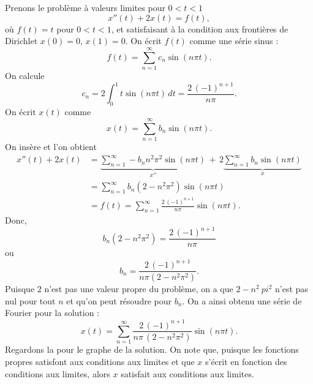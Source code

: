 \begin{example}
Prenons le problème à valeurs limites pour $0 < t < 1$
\begin{equation*}
x''(t) + 2 x(t) = f(t) ,
\end{equation*}
où $f(t) = t$ pour $0 < t < 1$, et satisfaisant à la condition aux frontières de Dirichlet  $x(0) = 0$, $x(1)=0$.
On écrit $f(t)$ comme une série sinus :
\begin{equation*}
f(t) = \sum_{n=1}^\infty c_n \sin (n \pi t) .
\end{equation*}
On calcule
\begin{equation*}
c_n = 2 \int_0^1 t \sin (n \pi t) \,dt = \frac{2 \, {(-1)}^{n+1}}{n \pi} .
\end{equation*}
On écrit  $x(t)$ comme
\begin{equation*}
x(t) = \sum_{n=1}^\infty b_n \sin (n \pi t) .
\end{equation*}
On insère et l'on obtient
\begin{equation*}
\begin{split}
x''(t) + 2 x(t) & =
\underbrace{
\sum_{n=1}^\infty - b_n n^2 \pi^2 \sin (n \pi t)
}_{x''}
\,
+
\,
2
\underbrace{
\sum_{n=1}^\infty b_n \sin (n \pi t)
}_{x}
\\
& =
\sum_{n=1}^\infty b_n (2 - n^2 \pi^2 ) \sin (n \pi t)
\\
& = f(t)
=
\sum_{n=1}^\infty  \frac{2\, {(-1)}^{n+1}}{n \pi} \sin (n \pi t) .
\end{split}
\end{equation*}
Donc,
\begin{equation*}
b_n (2 - n^2 \pi^2)
=
\frac{2\,{(-1)}^{n+1}}{n \pi}
\end{equation*}
ou
\begin{equation*}
b_n
=
\frac{2\,{(-1)}^{n+1}}{n \pi (2 - n^2 \pi^2)} .
\end{equation*}
Puisque $ 2 $ n'est pas une valeur propre du problème, on a que $ 2-n ^ 2 \ pi ^ 2 $ n'est pas nul pour tout $ n $ et qu'on peut résoudre pour $ b_n $. On a ainsi obtenu une série de Fourier pour la solution :
\begin{equation*}
x(t) = 
\sum_{n=1}^\infty
\frac{2\,{(-1)}^{n+1}}{n \pi \,(2 - n^2 \pi^2)}
\sin (n \pi t) .
\end{equation*}
Regardons la  pour le graphe de la solution.
On note que, puisque les fonctions propres satisfont aux conditions aux limites
et que $ x $ s'écrit en fonction des conditions aux limites, alors $ x $
satisfait aux conditions aux limites.
\begin{myfig}
\capstart
{}
\caption{Graphe de la solution de $x''+2x=t$, $x(0)=0$, $x(1)=0$.%
\label{bnd-dirich-graph:fig}}
\end{myfig}
\end{example}

